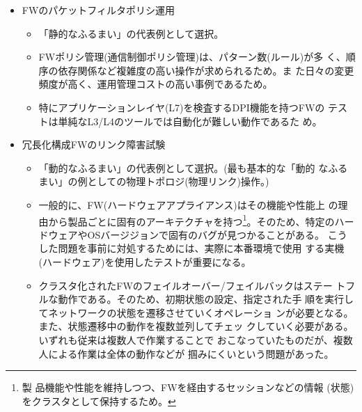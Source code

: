 \begin{itemize}
 \item FWのパケットフィルタポリシ運用
       \begin{itemize}
        \item 「静的なふるまい」の代表例として選択。
        \item FWポリシ管理(通信制御ポリシ管理)は、パターン数(ルール)が多
              く、順序の依存関係など複雑度の高い操作が求められるため。ま
              た日々の変更頻度が高く、運用管理コストの高い事例であるため。
        \item 特にアプリケーションレイヤ(L7)を検査するDPI機能を持つFWの
              テストは単純なL3/L4のツールでは自動化が難しい動作であるた
              め。
       \end{itemize}
 \item 冗長化構成FWのリンク障害試験
       \begin{itemize}
        \item 「動的なふるまい」の代表例として選択。(最も基本的な「動的
              なふるまい」の例としての物理トポロジ(物理リンク)操作。)
        \item 一般的に、FW(ハードウェアアプライアンス)はその機能や性能上
              の理由から製品ごとに固有のアーキテクチャを持つ\footnote{製
              品機能や性能を維持しつつ、FWを経由するセッションなどの情報
              (状態)をクラスタとして保持するため。}。そのため、特定のハー
              ドウェアやOSバージジョンで固有のバグが見つかることがある。
              こうした問題を事前に対処するためには、実際に本番環境で使用
              する実機(ハードウェア)を使用したテストが重要になる。
        \item クラスタ化されたFWのフェイルオーバー/フェイルバックはステー
              トフルな動作である。そのため、初期状態の設定、指定された手
              順を実行してネットワークの状態を遷移させていくオペレーショ
              ンが必要となる。また、状態遷移中の動作を複数並列してチェッ
              クしていく必要がある。いずれも従来は複数人で作業することで
              おこなっていたものだが、複数人による作業は全体の動作などが
              掴みにくいという問題があった。
       \end{itemize}
\end{itemize}

